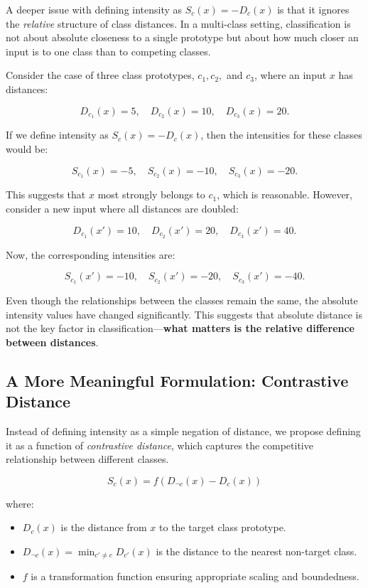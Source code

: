 A deeper issue with defining intensity as \( S_c(x) = -D_c(x) \) is that it ignores the \textit{relative} structure of class distances. In a multi-class setting, classification is not about absolute closeness to a single prototype but about how much closer an input is to one class than to competing classes.

Consider the case of three class prototypes, \( c_1, c_2, \) and \( c_3 \), where an input \( x \) has distances:

\[
D_{c_1}(x) = 5, \quad D_{c_2}(x) = 10, \quad D_{c_3}(x) = 20.
\]

If we define intensity as \( S_c(x) = -D_c(x) \), then the intensities for these classes would be:

\[
S_{c_1}(x) = -5, \quad S_{c_2}(x) = -10, \quad S_{c_3}(x) = -20.
\]

This suggests that \( x \) most strongly belongs to \( c_1 \), which is reasonable. However, consider a new input where all distances are doubled:

\[
D_{c_1}(x') = 10, \quad D_{c_2}(x') = 20, \quad D_{c_3}(x') = 40.
\]

Now, the corresponding intensities are:

\[
S_{c_1}(x') = -10, \quad S_{c_2}(x') = -20, \quad S_{c_3}(x') = -40.
\]

Even though the relationships between the classes remain the same, the absolute intensity values have changed significantly. This suggests that absolute distance is not the key factor in classification—\textbf{what matters is the relative difference between distances}.

\subsection{A More Meaningful Formulation: Contrastive Distance}

Instead of defining intensity as a simple negation of distance, we propose defining it as a function of \textit{contrastive distance}, which captures the competitive relationship between different classes.

\[
S_c(x) = f(D_{\neg c}(x) - D_c(x))
\]

where:

\begin{itemize}
    \item \( D_c(x) \) is the distance from \( x \) to the target class prototype.
    \item \( D_{\neg c}(x) = \min_{c' \neq c} D_{c'}(x) \) is the distance to the nearest non-target class.
    \item \( f \) is a transformation function ensuring appropriate scaling and boundedness.
\end{itemize}

